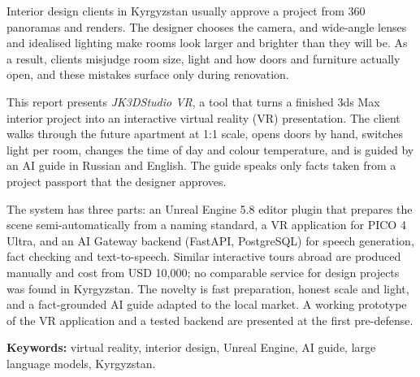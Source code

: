 Interior design clients in Kyrgyzstan usually approve a project from 360\textdegree{} panoramas and renders. The designer chooses the camera, and wide-angle lenses and idealised lighting make rooms look larger and brighter than they will be. As a result, clients misjudge room size, light and how doors and furniture actually open, and these mistakes surface only during renovation.

This report presents \textit{JK3DStudio VR}, a tool that turns a finished 3ds Max interior project into an interactive virtual reality (VR) presentation. The client walks through the future apartment at 1:1 scale, opens doors by hand, switches light per room, changes the time of day and colour temperature, and is guided by an AI guide in Russian and English. The guide speaks only facts taken from a project passport that the designer approves.

The system has three parts: an Unreal Engine 5.8 editor plugin that prepares the scene semi-automatically from a naming standard, a VR application for PICO 4 Ultra, and an AI Gateway backend (FastAPI, PostgreSQL) for speech generation, fact checking and text-to-speech. Similar interactive tours abroad are produced manually and cost from USD 10{,}000; no comparable service for design projects was found in Kyrgyzstan. The novelty is fast preparation, honest scale and light, and a fact-grounded AI guide adapted to the local market. A working prototype of the VR application and a tested backend are presented at the first pre-defense.

\medskip\noindent\textbf{Keywords:} virtual reality, interior design, Unreal Engine, AI guide, large language models, Kyrgyzstan.

